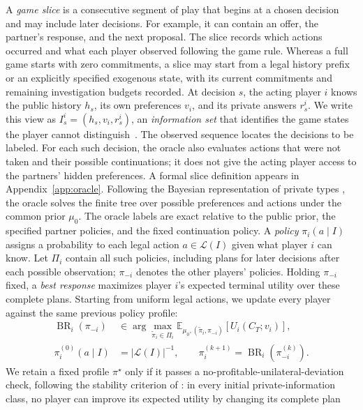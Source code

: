 A \emph{game slice} is a consecutive segment of play that begins at a chosen
decision and may include later decisions. For example, it can contain an
offer, the partner's response, and the next proposal. The slice records which
actions occurred and what each player observed following the game rule.
Whereas a full game starts with zero commitments, a slice may start from a
legal history prefix or an explicitly specified exogenous state, with its
current commitments and remaining investigation budgets recorded.
At decision $s$, the acting player $i$
knows the public history $h_s$, its own preferences $v_i$, and its private
answers $r_s^i$. We write this view as $I_s^i=(h_s,v_i,r_s^i)$, an
\emph{information set} that identifies the game states the player cannot
distinguish~\citep{kuhn1953extensive}. The observed sequence locates the
decisions to be labeled. For each such decision, the oracle also evaluates
actions that were not taken and their possible continuations; it does not
give the acting player access to the partners' hidden preferences. A formal
slice definition appears in Appendix~\ref{app:oracle}. Following the Bayesian
representation of private types
\citep{harsanyi1967games}, the oracle solves the finite tree over possible
preferences and actions under the common prior $\mu_0$.
The oracle labels are exact relative to the public prior, the specified
partner policies, and the fixed continuation policy.
A \emph{policy} $\pi_i(a\mid I)$ assigns a probability to each legal action
$a\in\mathcal L(I)$ given what player $i$ can know. Let $\Pi_i$ contain all
such policies, including plans for later decisions after each possible
observation; $\pi_{-i}$ denotes the other players' policies. Holding
$\pi_{-i}$ fixed, a \emph{best response} maximizes player $i$'s expected
terminal utility over these complete plans. Starting from uniform legal
actions, we update every player against the same previous policy profile:
\begin{align}
 \operatorname{BR}_i(\pi_{-i})
 &\in\arg\max_{\widetilde\pi_i\in\Pi_i}
 \mathbb E_{\mu_0,(\widetilde\pi_i,\pi_{-i})}
 [U_i(C_T;v_i)],\nonumber\\
 \pi_i^{(0)}(a\mid I)&=|\mathcal L(I)|^{-1},\qquad
 \pi_i^{(k+1)}=\operatorname{BR}_i(\pi_{-i}^{(k)}).
 \label{eq:oracle-iteration}
\end{align}
We retain a fixed profile $\pi^\star$ only if it passes a
no-profitable-unilateral-deviation check, following the stability criterion
of \citet{nash1950equilibrium}: in every initial private-information class,
no player can improve its expected utility by changing its complete plan
